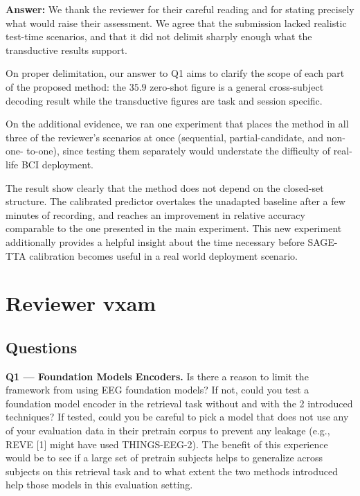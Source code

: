 \documentclass[11pt]{article}
\newcommand{\answer}[1]{{\textbf{Answer:} \color{blue} #1}}
\begin{document}
\answer{
We thank the reviewer for their careful reading and for stating precisely what would raise their
assessment. We agree that the submission lacked realistic test-time scenarios, and that it did not
delimit sharply enough what the transductive results support.

On proper delimitation, our answer to Q1 aims to clarify the scope of each part of the proposed method: the $35.9$ zero-shot figure is a general cross-subject decoding result while the transductive figures are task and session specific.


On the additional evidence, we ran one experiment that places the method in all three of the reviewer's scenarios
at once (sequential, partial-candidate, and non-one-
to-one), since testing them separately would understate the difficulty of real-life BCI deployment.

The result show clearly that the method does not depend on the closed-set structure. The calibrated predictor overtakes the unadapted baseline after a few minutes of recording, and reaches an improvement in relative accuracy comparable to the one presented in the main experiment. This new experiment additionally provides a helpful insight about the time necessary before SAGE-TTA calibration becomes useful in a real world deployment scenario.
}

\section{Reviewer vxam}

\subsection{Questions}

\textbf{Q1 --- Foundation Models Encoders.} Is there a reason to limit the framework from using EEG
foundation models? If not, could you test a foundation model encoder in the retrieval task without and
with the 2 introduced techniques? If tested, could you be careful to pick a model that does not use any
of your evaluation data in their pretrain corpus to prevent any leakage (e.g., REVE [1] might have used
THINGS-EEG-2). The benefit of this experience would be to see if a large set of pretrain subjects helps
to generalize across subjects on this retrieval task and to what extent the two methods introduced help
those models in this evaluation setting.
\end{document}
